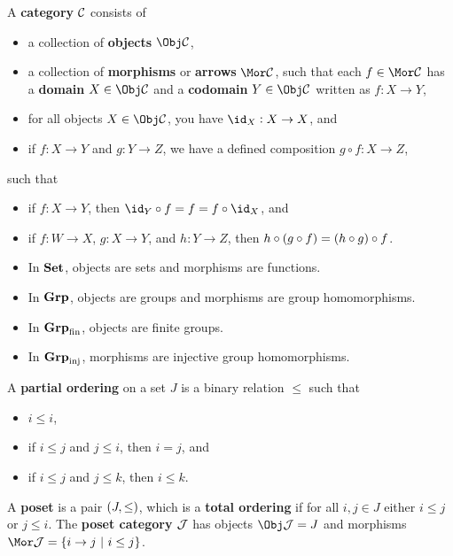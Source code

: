 \begin{definition*}
A \textbf{category} $ \mathcal{C} $ consists of
\begin{itemize}
\item a collection of \textbf{objects} $ \Obj \CCC $,
\item a collection of \textbf{morphisms} or \textbf{arrows} $ \Mor \CCC $, such that each $ f \in \Mor \CCC $ has a \textbf{domain} $ X \in \Obj \CCC $ and a \textbf{codomain} $ Y \in \Obj \CCC $ written as $ f : X \to Y $,
\item for all objects $ X \in \Obj \CCC $, you have $ \id_X : X \to X $, and
\item if $ f : X \to Y $ and $ g : Y \to Z $, we have a defined composition $ g \circ f : X \to Z $,
\end{itemize}
such that
\begin{itemize}
\item if $ f : X \to Y $, then $ \id_Y \circ f = f = f \circ \id_X $, and
\item if $ f : W \to X $, $ g : X \to Y $, and $ h : Y \to Z $, then $ h \circ \br{g \circ f} = \br{h \circ g} \circ f $.
\end{itemize}
\end{definition*}

\pagebreak

\begin{example*}
\hfill
\begin{itemize}
\item In $ \textbf{Set} $, objects are sets and morphisms are functions.
\item In $ \textbf{Grp} $, objects are groups and morphisms are group homomorphisms.
\item In $ \textbf{Grp}_{\text{fin}} $, objects are finite groups.
\item In $ \textbf{Grp}_{\text{inj}} $, morphisms are injective group homomorphisms.
\end{itemize}
\end{example*}

\begin{definition*}
A \textbf{partial ordering} on a set $ J $ is a binary relation $ \le $ such that
\begin{itemize}
\item $ i \le i $,
\item if $ i \le j $ and $ j \le i $, then $ i = j $, and
\item if $ i \le j $ and $ j \le k $, then $ i \le k $.
\end{itemize}
A \textbf{poset} is a pair $ \br{J, \le} $, which is a \textbf{total ordering} if for all $ i, j \in J $ either $ i \le j $ or $ j \le i $. The \textbf{poset category} $ \mathcal{J} $ has objects $ \Obj \JJJ = J $ and morphisms $ \Mor \JJJ = \cbr{i \to j \st i \le j} $.
\end{definition*}

